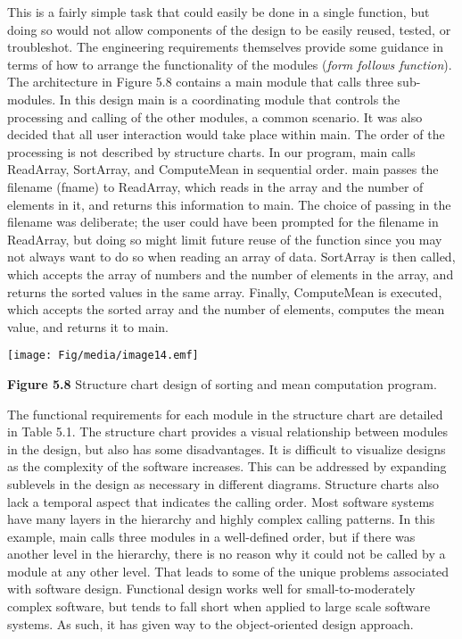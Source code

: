 This is a fairly simple task that could easily be done in a single
function, but doing so would not allow components of the design to be
easily reused, tested, or troubleshot. The engineering requirements
themselves provide some guidance in terms of how to arrange the
functionality of the modules (\emph{form follows function}). The
architecture in Figure 5.8 contains a main module that calls three
sub-modules. In this design main is a coordinating module that controls
the processing and calling of the other modules, a common scenario. It
was also decided that all user interaction would take place within main.
The order of the processing is not described by structure charts. In our
program, main calls ReadArray, SortArray, and ComputeMean in sequential
order. main passes the filename (fname) to ReadArray, which reads in the
array and the number of elements in it, and returns this information to
main. The choice of passing in the filename was deliberate; the user
could have been prompted for the filename in ReadArray, but doing so
might limit future reuse of the function since you may not always want
to do so when reading an array of data. SortArray is then called, which
accepts the array of numbers and the number of elements in the array,
and returns the sorted values in the same array. Finally, ComputeMean is
executed, which accepts the sorted array and the number of elements,
computes the mean value, and returns it to main.

\texttt{[image: Fig/media/image14.emf]}

\textbf{Figure 5.8} Structure chart design of sorting and mean
computation program.

The functional requirements for each module in the structure chart are
detailed in Table 5.1. The structure chart provides a visual
relationship between modules in the design, but also has some
disadvantages. It is difficult to visualize designs as the complexity of
the software increases. This can be addressed by expanding sublevels in
the design as necessary in different diagrams. Structure charts also
lack a temporal aspect that indicates the calling order. Most software
systems have many layers in the hierarchy and highly complex calling
patterns. In this example, main calls three modules in a well-defined
order, but if there was another level in the hierarchy, there is no
reason why it could not be called by a module at any other level. That
leads to some of the unique problems associated with software design.
Functional design works well for small-to-moderately complex software,
but tends to fall short when applied to large scale software systems. As
such, it has given way to the object-oriented design approach.

